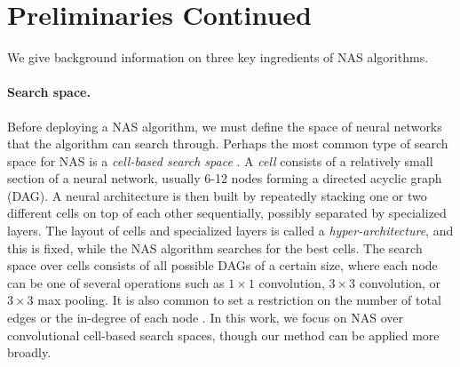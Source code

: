 \documentclass[11pt]{article}
\numberwithin{equation}{section}
\numberwithin{figure}{section}
\theoremstyle{plain}
\theoremstyle{definition}
\let\citep\cite
\begin{document}
\begin{comment}
\paragraph{Subsequent work.}
Since its release, several papers have independently verified that BANANAS is 
state of the art~\citep{remaade, nasbench301},
or second only to follow-up work~\citep{nguyen2020optimal, nasbowl, npenas}.
Notably, one paper~\citep{remaade} showed that BANANAS is state-of-the-art on NASBench-101
when given a budget of 3200 evaluations, and another paper~\citep{nasbench301} showed that
BANANAS is state-of-the-art on a new surrogate benchmark on the DARTS
search space.
Finally, a recent paper conducted a study on several encodings used for 
NAS~\cite{white2020study}, concluding that the path encoding,
even when truncated, is particularly well-suited for neural predictors.
In particular, as mentioned in Section~\ref{sec:methodology}, the path encoding is not
one-to-one (multiple architectures can map to the same encoding), but they show that only architectures with very similar accuracy map to the same encoding, meaning that
this actually \emph{improves} NAS performance.
Furthermore, they improved upon the theoretical results we presented in
Section~\ref{sec:methodology} by proving a result that is similar to 
Theorem~\ref{thm:path_length_informal} where $k$ is independent of $n$, 
and they also show a matching lower bound.
\end{comment}
 \section{Preliminaries Continued}
\label{app:preliminaries}
We give background information on three 
key ingredients of NAS algorithms.
\paragraph{Search space.}
Before deploying a NAS algorithm, we must define the space of neural networks that the algorithm can search through.
Perhaps the most common type of search space for NAS is a \emph{cell-based search space} \cite{zoph2017neural, enas, darts, randomnas, sciuto2019evaluating, nasbench}.
A \emph{cell} consists of a
relatively small section of a neural network, usually 6-12
nodes forming a directed acyclic graph (DAG). 
A neural architecture is then built by
repeatedly stacking one or two different cells on top of each
other sequentially, possibly separated by specialized layers. The
layout of cells and specialized layers is called a
\emph{hyper-architecture}, and this is fixed, while the NAS
algorithm searches for the best cells. The search space over
cells consists of all possible DAGs of a certain size, 
where each node can be one of several operations such as $1\times 1$ convolution, $3\times 3$ convolution, or $3\times 3$ max pooling. 
It is also common to set a restriction on the number of total edges or
the in-degree of each node \cite{nasbench, darts}.
In this work, we focus on NAS over convolutional cell-based search spaces,
though our method can be applied more broadly.
\end{document}
